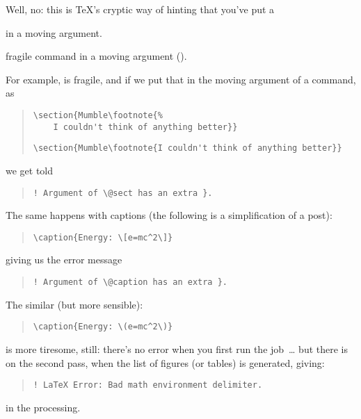Well, no: this is \TeX{}'s cryptic way of hinting that you've put a
\begin{wideversion} %
 in a moving argument.
\end{wideversion}
\begin{narrowversion}
fragile command in a moving argument ().
\end{narrowversion}

For example,  is fragile, and if we put that in the
moving argument of a  command, as
\begin{quote}
\begin{narrowversion}
\begin{verbatim}
\section{Mumble\footnote{%
    I couldn't think of anything better}}
\end{verbatim}
\end{narrowversion}
\begin{wideversion}
\begin{verbatim}
\section{Mumble\footnote{I couldn't think of anything better}}
\end{verbatim}
\end{wideversion}
\end{quote}
we get told
\begin{quote}
\begin{verbatim}
! Argument of \@sect has an extra }.
\end{verbatim}
\end{quote}
The same happens with captions (the following is a simplification of a
 post):
\begin{quote}
\begin{verbatim}
\caption{Energy: \[e=mc^2\]}
\end{verbatim}
\end{quote}
giving us the error message
\begin{quote}
\begin{verbatim}
! Argument of \@caption has an extra }.
\end{verbatim}
\end{quote}
The similar (but more sensible):
\begin{quote}
\begin{verbatim}
\caption{Energy: \(e=mc^2\)}
\end{verbatim}
\end{quote}
is more tiresome, still: there's no error when you first run the
job~\dots{} but there is on the second pass, when the list of figures
(or tables) is generated, giving:
\begin{quote}
\begin{verbatim}
! LaTeX Error: Bad math environment delimiter.
\end{verbatim}
\end{quote}
in the  processing.

